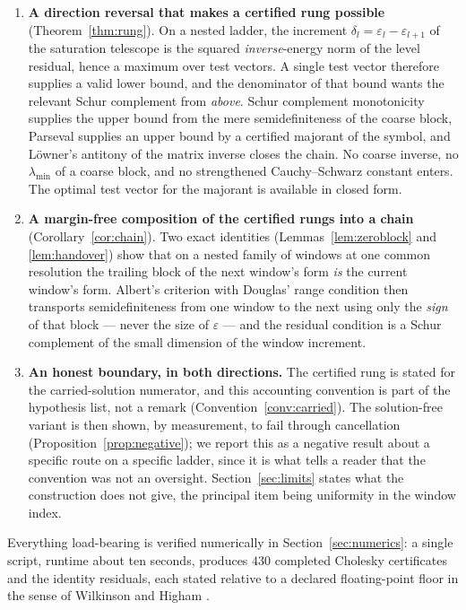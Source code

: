 \documentclass[11pt,a4paper]{article}
\theoremstyle{plain}
\theoremstyle{definition}
\newcommand{\lmin}{\lambda_{\min}}
\begin{document}
\begin{enumerate}[label=(C\arabic*),leftmargin=3.1em]
\item \textbf{A direction reversal that makes a certified rung possible}
  (Theorem~\ref{thm:rung}). On a nested ladder, the increment
  $\delta_{l}=\varepsilon_{l}-\varepsilon_{l+1}$ of the saturation telescope is the
  squared \emph{inverse}-energy norm of the level residual, hence a maximum over test
  vectors. A single test vector therefore supplies a valid lower bound, and the
  denominator of that bound wants the relevant Schur complement from \emph{above}.
  Schur complement monotonicity \cite{Haynsworth1968} supplies the upper bound from
  the mere semidefiniteness of the coarse block, Parseval supplies an upper bound by
  a certified majorant of the symbol, and L\"owner's antitony of the matrix inverse
  \cite{Loewner1934} closes the chain. No coarse inverse, no $\lmin$ of a coarse
  block, and no strengthened Cauchy--Schwarz constant enters. The optimal test vector
  for the majorant is available in closed form.
\item \textbf{A margin-free composition of the certified rungs into a chain}
  (Corollary~\ref{cor:chain}). Two exact identities (Lemmas~\ref{lem:zeroblock} and
  \ref{lem:handover}) show that on a nested family of windows at one common
  resolution the trailing block of the next window's form \emph{is} the current
  window's form. Albert's criterion \cite{Albert1969} with Douglas' range condition
  \cite{Douglas1966} then transports semidefiniteness from one window to the next
  using only the \emph{sign} of that block --- never the size of $\varepsilon$ ---
  and the residual condition is a Schur complement of the small dimension of the
  window increment.
\item \textbf{An honest boundary, in both directions.} The certified rung is stated
  for the carried-solution numerator, and this accounting convention is part of the
  hypothesis list, not a remark (Convention~\ref{conv:carried}). The solution-free
  variant is then shown, by measurement, to fail through cancellation
  (Proposition~\ref{prop:negative}); we report this as a negative result about a
  specific route on a specific ladder, since it is what tells a reader that the
  convention was not an oversight. Section~\ref{sec:limits} states what the
  construction does not give, the principal item being uniformity in the window index.
\end{enumerate}

Everything load-bearing is verified numerically in Section~\ref{sec:numerics}: a
single script, runtime about ten seconds, produces $430$ completed Cholesky
certificates and the identity residuals, each stated relative to a declared
floating-point floor in the sense of Wilkinson and Higham
\cite{Wilkinson1963,Higham2002}.
\end{document}
